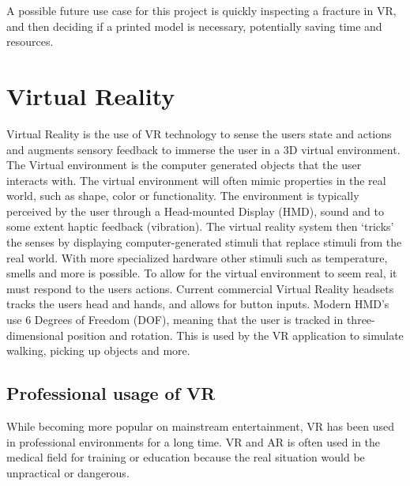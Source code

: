 \documentclass[a4paper]{report}
\begin{document}
A possible future use case for this project is quickly inspecting a fracture in VR, and then deciding if a printed model is necessary, potentially saving time and resources.


\section{Virtual Reality}
Virtual Reality is the use of VR technology to sense the users state and actions and augments sensory feedback to immerse the user in a 3D virtual environment\cite{mihelj_virtual_2014}.
The Virtual environment is the computer generated objects that the user interacts with. The virtual environment will often mimic properties in the real world, such as shape, color or functionality.
The environment is typically perceived by the user through a Head-mounted Display (HMD), sound and to some extent haptic feedback (vibration). The virtual reality system then ‘tricks’ the senses by displaying computer-generated stimuli that replace stimuli from the real world. With more specialized hardware other stimuli such as temperature, smells and more is possible\cite{noauthor_feelreal_nodate}.
To allow for the virtual environment to seem real, it must respond to the users actions. Current commercial Virtual Reality headsets tracks the users head and hands, and allows for button inputs\cite{noauthor_oculus_nodate}. Modern HMD's use 6 Degrees of Freedom (DOF), meaning that the user is tracked in three-dimensional position and rotation\cite{lang_introduction_2013}. This is used by the VR application to simulate walking, picking up objects and more.

\subsection{Professional usage of VR}
While becoming more popular on mainstream entertainment, VR has been used in professional environments for a long time\cite{needed}. VR and AR is often used in the medical field for training or education because the real situation would be unpractical or dangerous\cite{freina_immersive_2015}.
\end{document}

